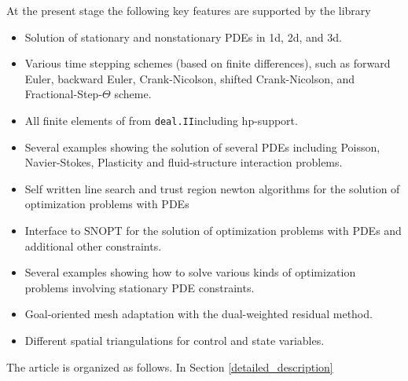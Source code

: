 \documentclass[prodmode,acmtoms]{acmsmall}
\numberwithin{equation}{section}
\newcommand{\deal}{\texttt{deal.II}}
\newcommand{\dope}{\texttt{DOpElib}}
\begin{document}
%

At the present stage the following key features are supported by the library
\begin{itemize}
\item Solution of stationary and nonstationary PDEs in 1d, 2d, and 3d.
\item Various time stepping schemes (based on finite differences), 
  such as forward Euler, backward Euler,
  Crank-Nicolson, shifted Crank-Nicolson, and Fractional-Step-$\Theta$ scheme.
\item All finite elements of from \deal including hp-support.
\item Several examples showing the solution of several PDEs including
   Poisson, Navier-Stokes, Plasticity and fluid-structure interaction problems. 
\item Self written line search and trust region newton algorithms for the 
   solution of optimization problems with PDEs \cite{NoWr00}
\item Interface to SNOPT for the solution of optimization problems with PDEs and
  additional other constraints.
\item Several examples showing how to solve various kinds of optimization problems
  involving stationary PDE constraints.
\item Goal-oriented mesh adaptation with the dual-weighted residual method.
\item Different spatial triangulations for control and state variables.
\end{itemize}

The article is organized as follows. In Section
\ref{detailed_description} 
 
\end{document}
